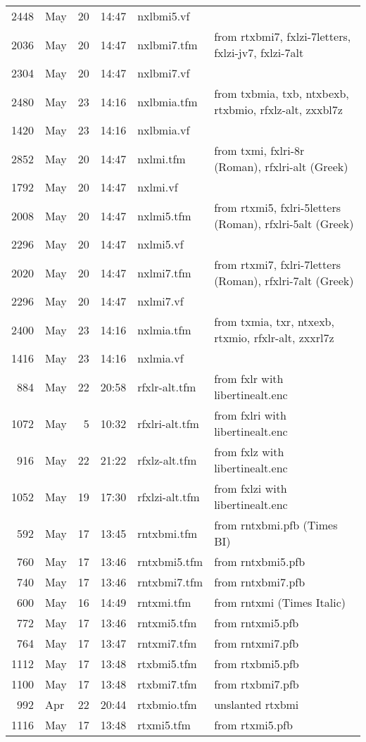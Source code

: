 \documentclass[10pt]{amsart}
\begin{document}
\begin{center}
\begin{longtable}{@{} rlrrll @{}}
2448&May&20&14:47&nxlbmi5.vf\\
2036&May&20&14:47&nxlbmi7.tfm& from rtxbmi7, fxlzi-7letters, fxlzi-jv7, fxlzi-7alt\\
2304&May&20&14:47&nxlbmi7.vf\\
2480&May&23&14:16&nxlbmia.tfm& from txbmia, txb, ntxbexb, rtxbmio, rfxlz-alt, zxxbl7z\\
1420&May&23&14:16&nxlbmia.vf\\
2852&May&20&14:47&nxlmi.tfm& from txmi, fxlri-8r (Roman), rfxlri-alt (Greek)\\
1792&May&20&14:47&nxlmi.vf\\
2008&May&20&14:47&nxlmi5.tfm& from rtxmi5, fxlri-5letters (Roman), rfxlri-5alt (Greek)\\
2296&May&20&14:47&nxlmi5.vf\\
2020&May&20&14:47&nxlmi7.tfm& from rtxmi7, fxlri-7letters (Roman), rfxlri-7alt (Greek)\\
2296&May&20&14:47&nxlmi7.vf\\
2400&May&23&14:16&nxlmia.tfm& from txmia, txr, ntxexb, rtxmio, rfxlr-alt, zxxrl7z\\
1416&May&23&14:16&nxlmia.vf\\
884&May&22&20:58&rfxlr-alt.tfm& from fxlr with libertinealt.enc\\
1072&May&5&10:32&rfxlri-alt.tfm& from fxlri with libertinealt.enc\\
916&May&22&21:22&rfxlz-alt.tfm& from fxlz with libertinealt.enc\\
1052&May&19&17:30&rfxlzi-alt.tfm& from fxlzi with libertinealt.enc\\
592&May&17&13:45&rntxbmi.tfm& from rntxbmi.pfb (Times BI)\\
760&May&17&13:46&rntxbmi5.tfm& from rntxbmi5.pfb\\
740&May&17&13:46&rntxbmi7.tfm& from rntxbmi7.pfb\\
600&May&16&14:49&rntxmi.tfm& from rntxmi (Times Italic)\\
772&May&17&13:46&rntxmi5.tfm& from rntxmi5.pfb\\
764&May&17&13:47&rntxmi7.tfm& from rntxmi7.pfb\\
1112&May&17&13:48&rtxbmi5.tfm& from rtxbmi5.pfb\\
1100&May&17&13:48&rtxbmi7.tfm&from rtxbmi7.pfb\\
992&Apr&22&20:44&rtxbmio.tfm& unslanted rtxbmi\\
1116&May&17&13:48&rtxmi5.tfm& from rtxmi5.pfb\\

\end{longtable}
\end{center}
\end{document}
